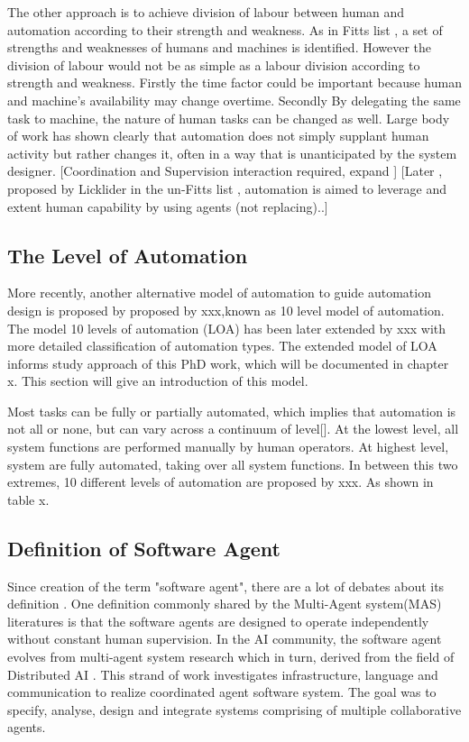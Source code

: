 The other approach is to achieve division of labour between human and automation according to their strength and weakness. As in Fitts list \cite{Fitts} , a set of strengths and weaknesses of humans and machines is identified. However the division of labour would not be as simple as a labour division according to strength and weakness. Firstly the time factor could be important because human and machine's availability may change overtime. Secondly By delegating the same task to machine, the nature of human tasks can be changed as well. Large body of work has shown clearly that automation does not simply supplant human activity but rather changes it, often in a way that is unanticipated by the system designer. [Coordination and Supervision interaction required, expand ] \cite{Bradshaw2011} [Later , proposed by Licklider in the un-Fitts list \cite{Hoffman2002}, automation is aimed to leverage and extent human capability by using agents (not replacing).\cite{Bradshaw2011}.] \\


\subsection{The Level of Automation}
More recently, another alternative model of automation to guide automation design is proposed by proposed by xxx,known as 10 level model of automation. The model 10 levels of automation (LOA) has been later extended by xxx with more detailed classification of automation types. The extended model of LOA informs study approach of this PhD work, which will be documented in chapter x. This section will give an introduction of this model. 


Most tasks can be fully or partially automated, which implies that automation is not all or none, but can vary across a continuum of level[]. At the lowest level, all system functions are performed manually by human operators.  At highest level, system are fully automated, taking over all system functions. In between this two extremes, 10 different levels of automation are proposed by xxx. As shown in table x. 


\subsection{ Definition of Software Agent }

Since creation of the term "software agent", there are a lot of debates about its definition . One definition commonly shared by the Multi-Agent system(MAS) literatures is that the software agents are designed to operate independently without constant human supervision. In the AI community, the software agent evolves from multi-agent system research which in turn, derived from the field of Distributed AI \cite{Vlassis2007}. This strand of work investigates infrastructure, language and communication to realize coordinated agent software system. The goal was to specify, analyse, design and integrate systems comprising of multiple collaborative agents.\cite{Nwana1996} \\

